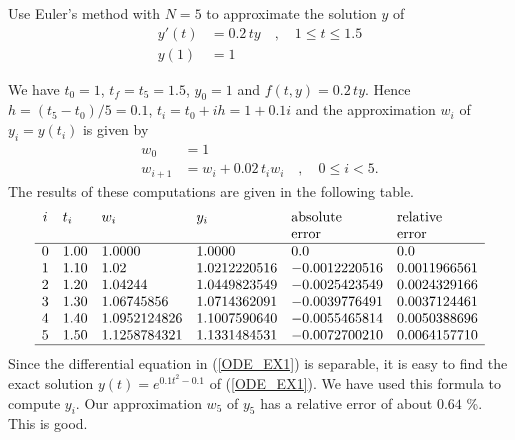 \begin{egg}
Use Euler's method with $N=5$ to approximate the solution $y$ of
\begin{equation}\label{ODE_EX1}
\begin{split}
y'(t) & =  0.2\,ty \quad, \quad 1 \leq t \leq 1.5 \\
y(1) & =  1
\end{split}
\end{equation}

We have $t_0=1$, $t_f= t_5 =1.5$, $y_0 = 1$ and $f(t,y) = 0.2\,ty$.
Hence $h = (t_5-t_0)/5 = 0.1$, $t_i = t_0 + ih =1 + 0.1i$ and
the approximation $w_i$ of $y_i = y(t_i)$ is given by
\begin{align*}
w_0 & = 1 \\
w_{i+1} & = w_i + 0.02\,t_i w_i \quad, \quad 0 \leq i < 5 .
\end{align*}
The results of these computations are given in the following table.
\[
\begin{array}{clllll}
i & t_i & w_i & y_i & \text{absolute} & \text{relative} \\
  & & & & \text{error} & \text{error} \\
\hline
0 & 1.00 & 1.0000 & 1.0000 & 0.0 & 0.0 \\
1 & 1.10 & 1.02 & 1.0212220516 & -0.0012220516 & 0.0011966561 \\
2 & 1.20 & 1.04244 & 1.0449823549 & -0.0025423549 & 0.0024329166 \\
3 & 1.30 & 1.06745856 & 1.0714362091 & -0.0039776491 & 0.0037124461 \\
4 & 1.40 & 1.0952124826 & 1.1007590640 & -0.0055465814 & 0.0050388696 \\
5 & 1.50 & 1.1258784321 & 1.1331484531 & -0.0072700210 & 0.0064157710 \\
\hline
\end{array}
\]
Since the differential equation in (\ref{ODE_EX1}) is separable, it is
easy to find the exact solution $y(t) = e^{0.1t^2 -0.1}$ of
(\ref{ODE_EX1}).  We have used this formula to compute $y_i$.
Our approximation $w_5$ of $y_5$ has a relative error of about $0.64$
\%.  This is good.
\end{egg}

